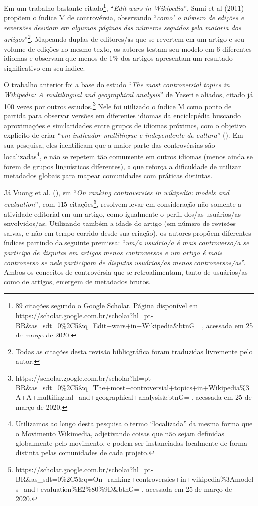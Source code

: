 Em um trabalho bastante citado\footnote{89 citações segundo o Google Scholar. Página disponível em https://scholar.google.com.br/scholar?hl=pt-BR\&as\_sdt=0\%2C5\&q=Edit+wars+in+Wikipedia\&btnG= , acessada em 25 de março de 2020.}, “\textit{Edit wars in Wikipedia}”, Sumi et al (2011) propõem o índice M de controvérsia, observando “\textit{como' o número de edições e reversões desviam em algumas páginas dos números seguidos pela maioria dos artigos}”\footnote{Todas as citações desta revisão bibliográfica foram traduzidas livremente pelo autor.}. Mapeando duplas de editores/as que se revertem em um artigo e seu volume de edições no mesmo texto, os autores testam seu modelo em 6 diferentes idiomas e observam que menos de 1\% dos artigos apresentam um resultado significativo em seu índice.

O trabalho anterior foi a base do estudo ``\textit{The most controversial topics in Wikipedia: A multilingual and geographical analysis}'' de Yaseri e aliados, citado já 100 vezes por outros estudos.\footnote{https://scholar.google.com.br/scholar?hl=pt-BR\&as\_sdt=0\%2C5\&q=The+most+controversial+topics+in+Wikipedia\%3A+A+multilingual+and+geographical+analysis\&btnG= , acessada em 25 de março de 2020.} Nele foi utilizado o 
índice M como ponto de partida para observar versões em diferentes idiomas da enciclopédia buscando aproximações e similaridades entre grupos de idiomas próximos, com o objetivo explícito de criar ``\textit{um indicador multilíngue e independente da cultura}'' (\cite{yasseri_controversial_2014}). Em sua pesquisa, eles identificam que a maior parte das controvérsias são localizadas\footnote{Utilizamos ao longo desta pesquisa o termo ``localizada'' da mesma forma que o Movimento Wikimedia, adjetivando coisas que não sejam definidas globalmente pelo movimento, e podem ser instanciadas localmente de forma distinta pelas comunidades de cada projeto.}, e não se repetem tão comumente em outros idiomas (menos ainda se forem de grupos linguísticos diferentes), o que reforça a dificuldade de utilizar metadados globais para mapear comunidades com práticas distintas.

Já Vuong et al. (\citeyear{vuong_ranking_2008}), em “\textit{On ranking controversies in wikipedia: models and evaluation}”, com 115 citações\footnote{	https://scholar.google.com.br/scholar?hl=pt-BR\&as\_sdt=0\%2C5\&q=On+ranking+controversies+in+wikipedia\%3A\+models+and+evaluation\%E2\%80\%9D\&btnG= , acessada em 25 de março de 2020.}, resolvem levar em consideração não somente a atividade editorial em um artigo, como igualmente o perfil dos/as usuários/as envolvidos/as. Utilizando também a idade do artigo (em número de revisões salvas, e não em tempo corrido desde sua criação), os autores propõem diferentes índices partindo da seguinte premissa: “\textit{um/a usuário/a é mais controverso/a se participa de disputas em artigos menos controversos e um artigo é mais controverso se nele participam de disputas usuários/as menos controversos/as}”. Ambos os conceitos de controvérsia que se retroalimentam, tanto de usuários/as como de artigos, emergem de metadados brutos.

